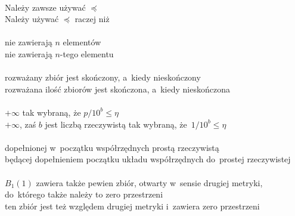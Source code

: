 \documentclass[a4paper,11pt]{article}
\begin{document}

\noindent
{} \\
\Jest  Należy zawsze używać $\preceq$ \\
\Powin Należy używać $\preceq$ raczej niż \\
 \\
\Jest  nie zawierają $n$ elementów \\
\Powin nie zawierają $n$-tego elementu \\
 \\
\Jest  rozważany zbiór jest skończony, a~kiedy nieskończony \\
\Powin rozważana ilość zbiorów jest skończona, a~kiedy nieskończona \\
 \\
\Jest  $+\infty$ tak wybraną, że $p / 10^{ b } \leq \eta$ \\
\Powin $+\infty$, zaś $b$ jest liczbą rzeczywistą tak wybraną,
że~$1 / 10^{ b } \leq \eta$ \\
 \\
\Jest dopełnionej w~początku współrzędnych prostą rzeczywistą \\
\Powin będącej dopełnieniem początku układu współrzędnych do~prostej
rzeczywistej \\
 \\
\Jest $B_{ 1 }( 1 )$ zawiera także pewien zbiór, otwarty w~sensie
drugiej
metryki, do~którego także należy to zero przestrzeni \\
\Powin ten zbiór jest też względem drugiej metryki i~zawiera zero
przestrzeni \\ %
\end{document}
